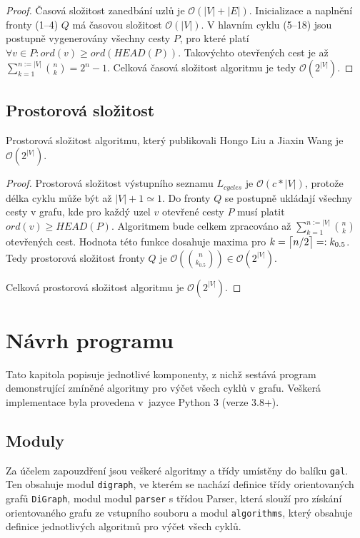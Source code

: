         \begin{proof}
            Časová složitost zanedbání uzlů je $\mathcal{O}(|V| + |E|)$. Inicializace a naplnění fronty (1--4) $Q$ má časovou složitost $\mathcal{O}(|V|)$. V hlavním cyklu (5--18) jsou postupně vygenerovány všechny cesty $P$, pro které platí $\forall v \in P: ord(v) \geq ord(HEAD(P))$. Takovýchto otevřených cest je až $\sum_{k=1}^{n:= |V|} {n \choose k} = 2^n - 1$. Celková časová složitost algoritmu je tedy $\mathcal{O}(2^{|V|})$.
        \end{proof}

    \section{Prostorová složitost}
        \begin{theorem}
            Prostorová složitost algoritmu, který publikovali Hongo Liu a Jiaxin Wang je $\mathcal{O}(2^{|V|})$.
        \end{theorem}

        \begin{proof}
            Prostorová složitost výstupního seznamu $L_{cycles}$ je $\mathcal{O}(c * |V|)$, protože délka cyklu může být až $|V| + 1 \simeq 1$. Do fronty $Q$ se postupně ukládají všechny cesty v grafu, kde pro každý uzel $v$ otevřené cesty $P$ musí platit $ord(v) \geq HEAD(P)$. Algoritmem bude celkem zpracováno až $\sum_{k=1}^{n:= |V|} {n \choose k}$ otevřených cest. Hodnota této funkce dosahuje maxima pro $k = \ceil[\big]{n/2} =: k_{0.5}$. Tedy prostorová složitost fronty $Q$ je $\mathcal{O}({n \choose k_{0.5}}) \in \mathcal{O}(2^{|V|})$.

            Celková prostorová složitost algoritmu je $\mathcal{O}(2^{|V|})$.
        \end{proof}

\chapter{Návrh programu}
    \label{chapter:Design}
    Tato kapitola popisuje jednotlivé komponenty, z nichž sestává program demonstrující zmíněné algoritmy pro výčet všech cyklů v grafu. Veškerá implementace byla provedena v~jazyce Python 3 (verze 3.8+).

    \section{Moduly}
        Za účelem zapouzdření jsou veškeré algoritmy a třídy umístěny do balíku \texttt{gal}. Ten obsahuje modul \texttt{digraph}, ve kterém se nachází definice třídy orientovaných grafů \texttt{DiGraph}, modul modul \texttt{parser} s třídou Parser, která slouží  pro získání orientovaného grafu ze vstupního souboru a modul \texttt{algorithms}, který obsahuje definice jednotlivých algoritmů pro výčet všech cyklů.


